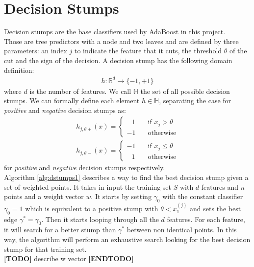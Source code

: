 
\chapter{Decision Stumps}
Decision stumps are the base classifiers used by AdaBoost in this project.\\
Those are tree predictors with a node and two leaves and are defined by three parameters: an index $j$ to indicate the feature that it cuts, the threshold $\theta$ of the cut and the sign of the decision. A decision stump has the following domain definition:
\begin{align}
\label{eq:dstumps_function}
	h:\mathbb{R}^d \to \lbrace-1, +1\rbrace
\end{align}
where $d$ is the number of features.
We call $\mathbb{H}$ the set of all  possible decision stumps. We can formally define each element $h \in \mathbb{H}$, separating the case for \textit{positive} and \textit{negative} decision stumps as:
\begin{align}
h_{j, \theta+}(x) =
\begin{cases}
\;\;\,1       & \quad \text{if } x_j > \theta\\
-1  & \quad \text{otherwise}
\end{cases}
\\
h_{j,\theta-}(x) =
\begin{cases}
-1			& \quad \text{if } x_j \leq \theta\\
\;\;\,1		& \quad \text{otherwise}
\end{cases}
\end{align}
for \textit{positive} and \textit{negative} decision stumps respectively.\\
Algorithm \ref{alg:dstumps1} describes a way to find the best decision stump given a set of weighted points. It takes in input the training set $S$ with $d$ features and $n$ points and a weight vector $w$. It starts by setting $\gamma_{0}$ with the constant classifier $\gamma_{0} = 1$ which is equivalent to a positive stump with $\theta < x_{1}^{(j)}$ and sets the best edge $\gamma^{*} = \gamma_{0}$. Then it starts looping through all the $d$ features. For each feature, it will search for a better stump than $\gamma^{*}$ between non identical points. In this way, the algorithm will perform an exhaustive search looking for the best decision stump for that training set.
\\\textbf{[TODO]} describe w vector \textbf{[ENDTODO]}
